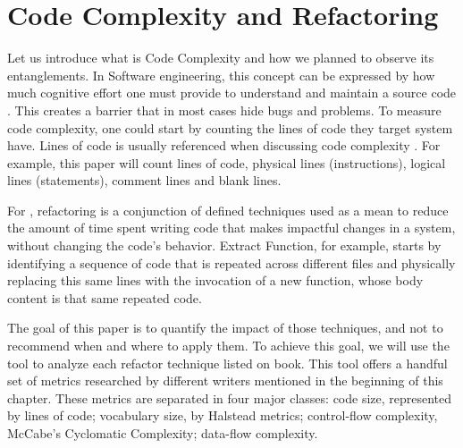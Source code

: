 \section{Code Complexity and Refactoring}

Let us introduce what is Code Complexity and how we planned to observe its entanglements.
In Software engineering, this concept can be expressed by how much cognitive effort one must provide
to understand and maintain a source code \cite{article:fmricc}. This creates a barrier that in most cases
hide bugs and problems.
To measure code complexity, one could start by counting the lines of code they target system have.
Lines of code is usually referenced when discussing code complexity \cite{article:rustcc}.
For example, this paper will count lines of code, physical lines (instructions), logical lines (statements), comment lines and
blank lines.

For \cite{book:refactoring}, refactoring is a conjunction of defined techniques used as a mean to reduce the amount of
time spent writing code that makes impactful changes in a system, without changing the code's behavior. Extract Function,
for example, starts by identifying a sequence of code that is repeated across different files and physically replacing
this same lines with the invocation of a new function, whose body content is that same repeated code.

The goal of this paper is to quantify the impact of those techniques, and not to recommend when and where to apply them.
To achieve this goal, we will use the \cite{article:mozilla} tool to analyze each refactor technique listed on
\cite{book:refactoring} book. This tool offers a handful set of metrics researched by
different writers mentioned in the beginning of this chapter. These metrics are separated in four major classes: code size,
represented by lines of code; vocabulary size, by Halstead metrics; control-flow complexity, McCabe's Cyclomatic
Complexity; data-flow complexity.
